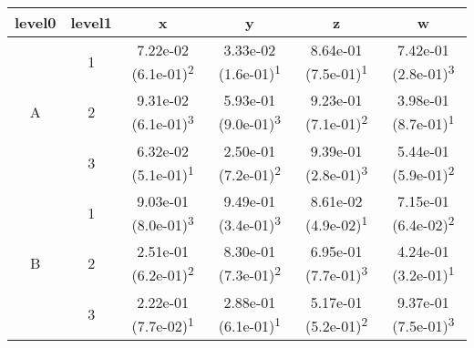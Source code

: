 \begin{tabular}{cccccc}
\toprule
level0 & level1&x&y&z&w\tabularnewline
\midrule
\multirow{3}{*}{A}&1& 7.22e-02 (6.1e-01)\textsuperscript{2}& 3.33e-02 (1.6e-01)\textsuperscript{1}& 8.64e-01 (7.5e-01)\textsuperscript{1}& 7.42e-01 (2.8e-01)\textsuperscript{3}\tabularnewline
&2& 9.31e-02 (6.1e-01)\textsuperscript{3}& 5.93e-01 (9.0e-01)\textsuperscript{3}& 9.23e-01 (7.1e-01)\textsuperscript{2}& 3.98e-01 (8.7e-01)\textsuperscript{1}\tabularnewline
&3& 6.32e-02 (5.1e-01)\textsuperscript{1}& 2.50e-01 (7.2e-01)\textsuperscript{2}& 9.39e-01 (2.8e-01)\textsuperscript{3}& 5.44e-01 (5.9e-01)\textsuperscript{2}\tabularnewline
\midrule
\multirow{3}{*}{B}&1& 9.03e-01 (8.0e-01)\textsuperscript{3}& 9.49e-01 (3.4e-01)\textsuperscript{3}& 8.61e-02 (4.9e-02)\textsuperscript{1}& 7.15e-01 (6.4e-02)\textsuperscript{2}\tabularnewline
&2& 2.51e-01 (6.2e-01)\textsuperscript{2}& 8.30e-01 (7.3e-01)\textsuperscript{2}& 6.95e-01 (7.7e-01)\textsuperscript{3}& 4.24e-01 (3.2e-01)\textsuperscript{1}\tabularnewline
&3& 2.22e-01 (7.7e-02)\textsuperscript{1}& 2.88e-01 (6.1e-01)\textsuperscript{1}& 5.17e-01 (5.2e-01)\textsuperscript{2}& 9.37e-01 (7.5e-01)\textsuperscript{3}\tabularnewline
\bottomrule
\end{tabular}

